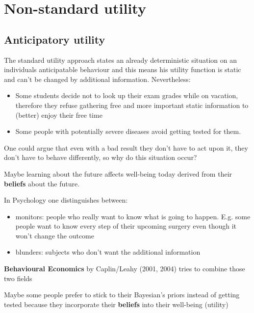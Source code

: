 
\chapter{Non-standard utility}


\section{Anticipatory utility}

The standard utility approach states an already deterministic situation on an individuals anticipatable behaviour and this means his utility function is static and can't be changed by additional information. Nevertheless:

\begin{itemize}
	\item Some students decide not to look up their exam grades while on vacation, therefore they refuse gathering free and more important static information to (better) enjoy their free time
	\item Some people with potentially severe diseases avoid getting tested for them.
\end{itemize}

One could argue that even with a bad result they don't have to act upon it, they don't have to behave differently, so why do this situation occur? 

Maybe learning about the future affects well-being today derived from their \textbf{beliefs} about the future.

In Psychology one distinguishes between:
\begin{itemize}
	\item monitors: people who really want to know what is going to happen. E.g. some people want to know every step of their upcoming surgery even though it won't change the outcome
	\item blunders: subjects who don't want the additional information
\end{itemize}

\textbf{Behavioural Economics} by Caplin/Leahy (2001, 2004) tries to combine those two fields

Maybe some people prefer to stick to their Bayesian's priors instead of getting tested because they incorporate their \textbf{beliefs} into their well-being (utility)

~\newline

